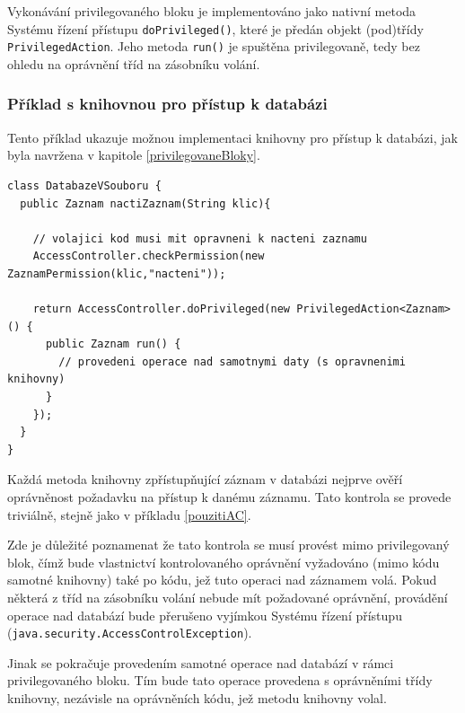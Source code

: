 Vykonávání privilegovaného bloku je implementováno jako nativní metoda Systému řízení přístupu {\tt doPrivileged()}, které je předán objekt (pod)třídy {\tt PrivilegedAction}. Jeho metoda {\tt run()} je spuštěna privilegovaně, tedy bez ohledu na oprávnění tříd na zásobníku volání.

\subsubsection{Příklad s knihovnou pro přístup k databázi}\label{databazeVsouboru}

Tento příklad ukazuje možnou implementaci knihovny pro přístup k databázi, jak byla navržena v kapitole \ref{privilegovaneBloky}.

\begin{lstlisting}[caption=Demonstrační knihovna pro přístup k databázi, label=pouzitiAC]
class DatabazeVSouboru {
  public Zaznam nactiZaznam(String klic){
    
    // volajici kod musi mit opravneni k nacteni zaznamu
    AccessController.checkPermission(new ZaznamPermission(klic,"nacteni"));
    
    return AccessController.doPrivileged(new PrivilegedAction<Zaznam>() {
      public Zaznam run() {
        // provedeni operace nad samotnymi daty (s opravnenimi knihovny)
      }
    });
  }
}
\end{lstlisting}

Každá metoda knihovny zpřístupňující záznam v databázi nejprve ověří oprávněnost požadavku na přístup k danému záznamu. Tato kontrola se provede triviálně, stejně jako v příkladu \ref{pouzitiAC}.

Zde je důležité poznamenat že tato kontrola se musí provést mimo privilegovaný blok, čímž bude vlastnictví kontrolovaného oprávnění vyžadováno (mimo kódu samotné knihovny) také po kódu, jež tuto operaci nad záznamem volá. Pokud některá z tříd na zásobníku volání nebude mít požadované oprávnění, provádění operace nad databází bude přerušeno vyjímkou Systému řízení přístupu ({\tt java.security.AccessControlException}).

Jinak se pokračuje provedením samotné operace nad databází v rámci privilegovaného bloku. Tím bude tato operace provedena s oprávněními třídy knihovny, nezávisle na oprávněních kódu, jež metodu knihovny volal.

